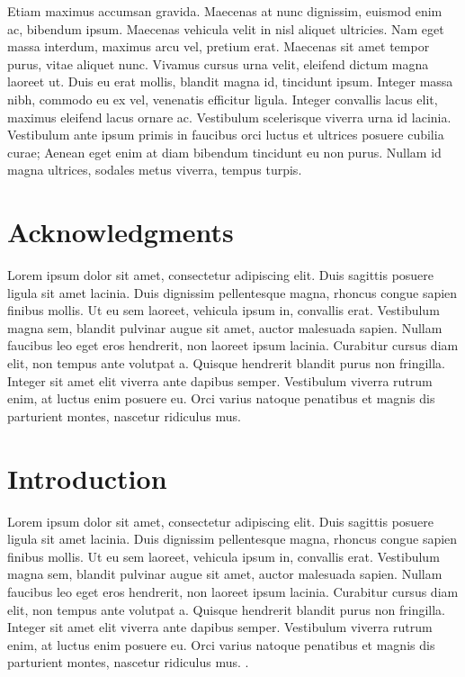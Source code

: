 \documentclass[
  a4paper,
  DIV=11,
  numbers=noendperiod]{scrreprt}
\begin{document}
Etiam maximus accumsan gravida. Maecenas at nunc dignissim, euismod enim
ac, bibendum ipsum. Maecenas vehicula velit in nisl aliquet ultricies.
Nam eget massa interdum, maximus arcu vel, pretium erat. Maecenas sit
amet tempor purus, vitae aliquet nunc. Vivamus cursus urna velit,
eleifend dictum magna laoreet ut. Duis eu erat mollis, blandit magna id,
tincidunt ipsum. Integer massa nibh, commodo eu ex vel, venenatis
efficitur ligula. Integer convallis lacus elit, maximus eleifend lacus
ornare ac. Vestibulum scelerisque viverra urna id lacinia. Vestibulum
ante ipsum primis in faucibus orci luctus et ultrices posuere cubilia
curae; Aenean eget enim at diam bibendum tincidunt eu non purus. Nullam
id magna ultrices, sodales metus viverra, tempus turpis.

\newpage{}


\chapter*{Acknowledgments}\label{acknowledgments}


Lorem ipsum dolor sit amet, consectetur adipiscing elit. Duis sagittis
posuere ligula sit amet lacinia. Duis dignissim pellentesque magna,
rhoncus congue sapien finibus mollis. Ut eu sem laoreet, vehicula ipsum
in, convallis erat. Vestibulum magna sem, blandit pulvinar augue sit
amet, auctor malesuada sapien. Nullam faucibus leo eget eros hendrerit,
non laoreet ipsum lacinia. Curabitur cursus diam elit, non tempus ante
volutpat a. Quisque hendrerit blandit purus non fringilla. Integer sit
amet elit viverra ante dapibus semper. Vestibulum viverra rutrum enim,
at luctus enim posuere eu. Orci varius natoque penatibus et magnis dis
parturient montes, nascetur ridiculus mus.

\newpage
\tableofcontents
\newpage


\chapter{Introduction}\label{introduction}

Lorem ipsum dolor sit amet, consectetur adipiscing elit. Duis sagittis
posuere ligula sit amet lacinia. Duis dignissim pellentesque magna,
rhoncus congue sapien finibus mollis. Ut eu sem laoreet, vehicula ipsum
in, convallis erat. Vestibulum magna sem, blandit pulvinar augue sit
amet, auctor malesuada sapien. Nullam faucibus leo eget eros hendrerit,
non laoreet ipsum lacinia. Curabitur cursus diam elit, non tempus ante
volutpat a. Quisque hendrerit blandit purus non fringilla. Integer sit
amet elit viverra ante dapibus semper. Vestibulum viverra rutrum enim,
at luctus enim posuere eu. Orci varius natoque penatibus et magnis dis
parturient montes, nascetur ridiculus mus.
\autocite{manesArtScienceEngineering2019,yaoTreeThoughtsDeliberate2023}.
\end{document}
